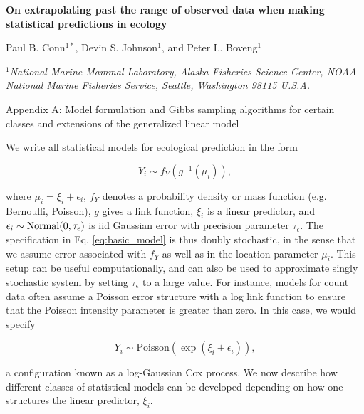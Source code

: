 \documentclass[12pt,fleqn]{article}
\begin{document}
\begin{center} \bf {\large On extrapolating past the range of observed data when making statistical predictions in ecology}

\vspace{0.7cm}
Paul B. Conn$^{1*}$, Devin S. Johnson$^1$, and Peter L. Boveng$^1$
\end{center}
\vspace{0.5cm}

\rm
\small

\it $^1$National Marine Mammal Laboratory, Alaska Fisheries Science Center,
NOAA National Marine Fisheries Service,
Seattle, Washington 98115 U.S.A.\\

\rm \begin{flushleft}

\raggedbottom
\vspace{.5in}

\begin{center}
Appendix A: Model formulation and Gibbs sampling algorithms for certain classes and extensions of the generalized linear model
\bigskip
\end{center}
\vspace{.3in}

\doublespacing



We write all statistical models for ecological prediction in the form
\begin{linenomath*}
\begin{equation}
  \label{eq:basic_model}
  Y_i \sim f_Y(g^{-1}(\mu_i)),
\end{equation}
\end{linenomath*}
where $\mu_i=\xi_i + \epsilon_i$, $f_Y$ denotes a probability density or mass function (e.g. Bernoulli, Poisson), $g$ gives a link function,
$\xi_i$ is a linear predictor, and $\epsilon_i \sim {\rm Normal}(0,\tau_\epsilon)$ is iid Gaussian error with precision parameter $\tau_\epsilon$.  The specification in Eq. \ref{eq:basic_model} is thus doubly stochastic, in the sense that we assume error associated with $f_Y$ as well as in the location parameter $\mu_i$.  This setup can be useful computationally, and can also be used to approximate singly stochastic system by setting $\tau_\epsilon$ to a large value.  For instance, models for count data often assume a Poisson error structure with a log link function to ensure that the Poisson intensity parameter is greater than zero.  In this case, we would specify
\begin{linenomath*}
\begin{equation*}
  Y_i \sim \mathrm{Poisson}(\exp(\xi_i + \epsilon_i)),
\end{equation*}
\end{linenomath*}
a configuration known as a log-Gaussian Cox process.
We now describe how different classes of statistical models can be developed depending on how one structures the linear predictor, $\xi_i$.


\end{flushleft}
\end{document}
